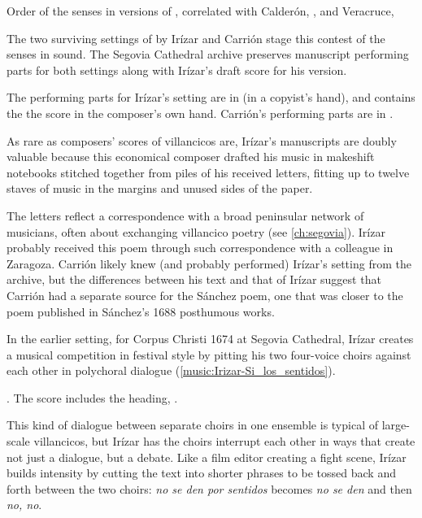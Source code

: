 \begin{table}
    \caption{Order of the senses in versions of ,
    correlated with Calderón, , and
    Veracruce, } 
    
    \label{tab:senses-order}
\end{table}

The two surviving settings of  by Irízar and Carrión
stage this contest of the senses in sound.
The Segovia Cathedral archive preserves manuscript performing parts for both
settings along with Irízar's draft score for his version.%
\begin{Footnote}
    The performing parts for Irízar's setting are in  (in a
    copyist's hand), and  contains the the score in the
    composer's own hand.
    Carrión's performing parts are in .
\end{Footnote}
As rare as composers' scores of villancicos are, Irízar's manuscripts are doubly
valuable because this economical composer drafted his music in makeshift
notebooks stitched together from piles of his received letters, fitting up to
twelve staves of music in the margins and unused sides of the paper.%
    \Autocites{LopezCalo:IrizarLetters1}{Olarte:Irizar}

The letters reflect a correspondence with a broad peninsular network of
musicians, often about exchanging villancico poetry (see \cref{ch:segovia}).%
    \Autocite{Rodriguez:Networks}
Irízar probably received this poem through such correspondence with a colleague
in Zaragoza.
Carrión likely knew (and probably performed) Irízar's setting from the archive,
but the differences between his text and that of Irízar suggest that Carrión had
a separate source for the Sánchez poem, one that was closer to the poem
published in Sánchez's 1688 posthumous works.%
    \Autocite[171--172]{Sanchez:LiraPoetica}

In the earlier setting, for Corpus Christi 1674 at Segovia Cathedral, Irízar
creates a musical competition in festival style by pitting his two four-voice
choirs against each other in polychoral dialogue
(\cref{music:Irizar-Si_los_sentidos}).%
\begin{Footnote}
    \Autocite[133--148]{Cashner:WLSCM32}.  
    The score includes the heading, .
\end{Footnote}
This kind of dialogue between separate choirs in one ensemble is typical of
large-scale villancicos, but Irízar has the choirs interrupt each other in ways
that create not just a dialogue, but a debate.
Like a film editor creating a fight scene, Irízar builds intensity by cutting
the text into shorter phrases to be tossed back and forth between the two
choirs: \emph{no se den por sentidos} becomes \emph{no se den} and then
\emph{no, no}.

